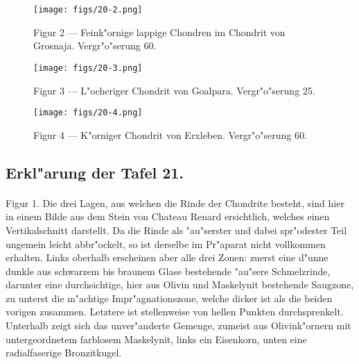 \documentclass[a4paper, 11pt, oneside, polutonikogreek, german]{article}
\begin{document}
\vspace*{\fill}
\begin{figure}[H]
\centering
\texttt{[image: figs/20-2.png]}
\caption{\small Figur 2 --- Feink"ornige lappige Chondren im Chondrit von Grosnaja. Vergr"o"serung 60.}
\end{figure}
\vspace*{\fill}
\clearpage

\vspace*{\fill}
\begin{figure}[H]
\centering
\texttt{[image: figs/20-3.png]}
\caption{\small Figur 3 --- L"ocheriger Chondrit von Goalpara. Vergr"o"serung 25.}
\end{figure}
\vspace*{\fill}
\clearpage

\vspace*{\fill}
\begin{figure}[H]
\centering
\texttt{[image: figs/20-4.png]}
\caption{\small Figur 4 --- K"orniger Chondrit von Erxleben. Vergr"o"serung 60.}
\end{figure}
\vspace*{\fill}
\clearpage

\subsection{Erkl"arung der Tafel 21.}
\paragraph{}
Figur 1. Die drei Lagen, aus welchen die Rinde der Chondrite besteht, sind hier in einem Bilde aus dem Stein von Chateau Renard ersichtlich, welches einen Vertikalschnitt darstellt. Da die Rinde als "au"serster und dabei spr"odester Teil ungemein leicht abbr"ockelt, so ist derselbe im Pr"aparat nicht vollkommen erhalten. Links oberhalb erscheinen aber alle drei Zonen: zuerst eine d"unne dunkle aus schwarzem bis braunem Glase bestehende "au"sere Schmelzrinde, darunter eine durchsichtige, hier aus Olivin und Maskelynit bestehende Saugzone, zu unterst die m"achtige Impr"agnationszone, welche dicker ist als die beiden vorigen zusammen. Letztere ist stellenweise von hellen Punkten durchsprenkelt. Unterhalb zeigt sich das unver"anderte Gemenge, zumeist aus Olivink"ornern mit untergeordnetem farblosem Maskelynit, links ein Eisenkorn, unten eine radialfaserige Bronzitkugel.
\end{document}
